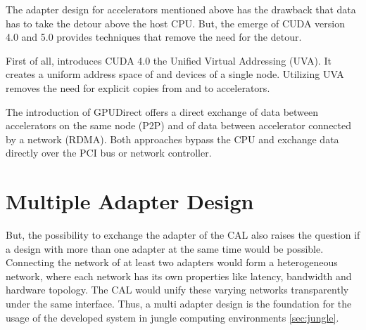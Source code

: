 The adapter design for accelerators mentioned above has the drawback
that data has to take the detour above the host CPU. But, the emerge
of CUDA version 4.0 and 5.0 provides techniques that remove the need
for the detour.

First of all, introduces CUDA 4.0 the Unified Virtual Addressing
(UVA).  It creates a uniform address space of and devices of a
single node. Utilizing UVA removes the need for explicit copies
from and to accelerators.

The introduction of GPUDirect offers a direct exchange of data
between accelerators on the same node (P2P) and of data between
accelerator connected by a network (RDMA).  Both approaches bypass
the CPU and exchange data directly over the PCI bus or network
controller.




\section*{Multiple Adapter Design}

But, the possibility to exchange the adapter of the CAL also raises
the question if a design with more than one adapter at the same time
would be possible. Connecting the network of at least two adapters
would form a heterogeneous network, where each network has its own
properties like latency, bandwidth and hardware topology. The CAL
would unify these varying networks transparently under the same
interface. Thus, a multi adapter design is the foundation for the
usage of the developed system in jungle computing environments
\ref{sec:jungle}.





